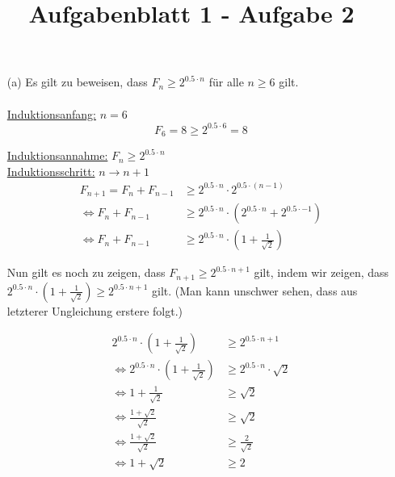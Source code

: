 \documentclass{article}
\title{Aufgabenblatt 1 - Aufgabe 2}
\begin{document}
\maketitle

\begin{enumerate}
\item[(a)]
Es gilt zu beweisen, dass $F_n \geq 2^{0.5 \cdot n}$ für alle $n \geq 6$ gilt.\\
\\

\underline{Induktionsanfang:} \quad $n = 6$ \\
\begin{equation*}
F_6 = 8 \geq 2^{0.5 \cdot 6} = 8
\end{equation*}

\underline{Induktionsannahme:} \quad $F_n \geq 2^{0.5 \cdot n}$ \\

\underline{Induktionsschritt:} \quad $n \to n+1$ \\
\begin{align*}
F_{n+1} = F_{n} + F_{n-1} &\geq 2^{0.5 \cdot n} \cdot 2^{0.5 \cdot (n-1)} \\
\Leftrightarrow F_{n} + F_{n-1} &\geq 2^{0.5 \cdot n} \cdot \left( 2^{0.5 \cdot
n} + 2^{0.5 \cdot -1} \right) \\
\Leftrightarrow F_{n} + F_{n-1} &\geq 2^{0.5 \cdot n} \cdot \left( 1 +
\frac{1}{\sqrt{2}} \right)
\end{align*}

Nun gilt es noch zu zeigen, dass $F_{n+1} \geq 2^{0.5 \cdot n+1}$ gilt, indem
wir zeigen, dass $2^{0.5 \cdot n} \cdot \left( 1 + \frac{1}{\sqrt{2}} \right)
\geq 2^{0.5 \cdot n+1}$ gilt. (Man kann unschwer sehen, dass aus letzterer
Ungleichung erstere folgt.)

\begin{align*}
2^{0.5 \cdot n} \cdot \left( 1 + \frac{1}{\sqrt{2}} \right) &\geq 2^{0.5 \cdot
n+1} \\
\Leftrightarrow 2^{0.5 \cdot n} \cdot \left( 1 + \frac{1}{\sqrt{2}} \right)
&\geq 2^{0.5 \cdot n} \cdot \sqrt{2} \\
\Leftrightarrow 1 + \frac{1}{\sqrt{2}} &\geq \sqrt{2} \\
\Leftrightarrow \frac{1 + \sqrt{2}}{\sqrt{2}} &\geq \sqrt{2} \\
\Leftrightarrow \frac{1 + \sqrt{2}}{\sqrt{2}} &\geq \frac{2}{\sqrt{2}} \\
\Leftrightarrow 1 + \sqrt{2} &\geq 2
\end{align*}


\end{enumerate}
\end{document}
